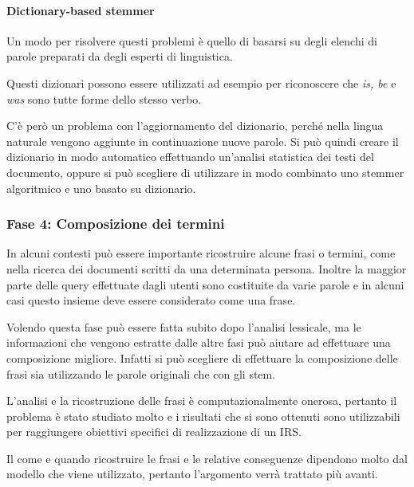


\paragraph{Dictionary-based stemmer}

Un modo per risolvere questi problemi è quello di basarsi su degli elenchi di parole preparati da degli esperti di linguistica.

Questi dizionari possono essere utilizzati ad esempio per riconoscere che \textit{is, be} e \textit{was} sono tutte forme dello stesso verbo.

C'è però un problema con l'aggiornamento del dizionario, perché nella lingua naturale vengono aggiunte in continuazione nuove parole.
Si può quindi creare il dizionario in modo automatico effettuando un'analisi statistica dei testi del documento, oppure si può scegliere di utilizzare in modo combinato uno stemmer algoritmico e uno basato su dizionario.

\subsubsection{Fase 4: Composizione dei termini}

In alcuni contesti può essere importante ricostruire alcune frasi o termini, come nella ricerca dei documenti scritti da una determinata persona.
Inoltre la maggior parte delle query effettuate dagli utenti sono costituite da varie parole e in alcuni casi questo insieme deve essere considerato come una frase.

Volendo questa fase può essere fatta subito dopo l'analisi lessicale, ma le informazioni che vengono estratte dalle altre fasi può aiutare ad effettuare una composizione migliore.
Infatti si può scegliere di effettuare la composizione delle frasi sia utilizzando le parole originali che con gli stem.

L'analisi e la ricostruzione delle frasi è computazionalmente onerosa, pertanto il problema è stato studiato molto e i risultati che si sono ottenuti sono utilizzabili per raggiungere obiettivi specifici di realizzazione di un IRS.

Il come e quando ricostruire le frasi e le relative conseguenze dipendono molto dal modello che viene utilizzato, pertanto l'argomento verrà trattato più avanti.

